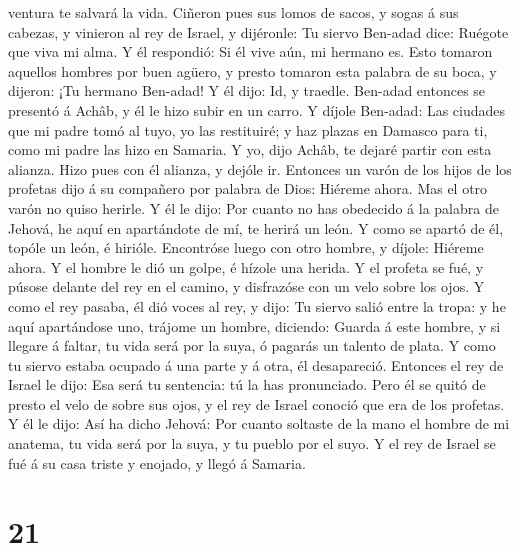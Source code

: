 ventura te salvará la vida.  Ciñeron pues sus lomos de
sacos, y sogas á sus cabezas, y vinieron al rey de Israel, y dijéronle:
Tu siervo Ben-adad dice: Ruégote que viva mi alma. Y él respondió: Si él
vive aún, mi hermano es.  Esto tomaron aquellos hombres por
buen agüero, y presto tomaron esta palabra de su boca, y dijeron: ¡Tu
hermano Ben-adad! Y él dijo: Id, y traedle. Ben-adad entonces se
presentó á Achâb, y él le hizo subir en un carro.  Y díjole
Ben-adad: Las ciudades que mi padre tomó al tuyo, yo las restituiré; y
haz plazas en Damasco para ti, como mi padre las hizo en Samaria. Y yo,
dijo Achâb, te dejaré partir con esta alianza. Hizo pues con él alianza,
y dejóle ir.  Entonces un varón de los hijos de los
profetas dijo á su compañero por palabra de Dios: Hiéreme ahora. Mas el
otro varón no quiso herirle.  Y él le dijo: Por cuanto no
has obedecido á la palabra de Jehová, he aquí en apartándote de mí, te
herirá un león. Y como se apartó de él, topóle un león, é hirióle.
 Encontróse luego con otro hombre, y díjole: Hiéreme ahora.
Y el hombre le dió un golpe, é hízole una herida.  Y el
profeta se fué, y púsose delante del rey en el camino, y disfrazóse con
un velo sobre los ojos.  Y como el rey pasaba, él dió voces
al rey, y dijo: Tu siervo salió entre la tropa: y he aquí apartándose
uno, trájome un hombre, diciendo: Guarda á este hombre, y si llegare á
faltar, tu vida será por la suya, ó pagarás un talento de plata.
 Y como tu siervo estaba ocupado á una parte y á otra, él
desapareció. Entonces el rey de Israel le dijo: Esa será tu sentencia:
tú la has pronunciado.  Pero él se quitó de presto el velo
de sobre sus ojos, y el rey de Israel conoció que era de los profetas.
 Y él le dijo: Así ha dicho Jehová: Por cuanto soltaste de
la mano el hombre de mi anatema, tu vida será por la suya, y tu pueblo
por el suyo.  Y el rey de Israel se fué á su casa triste y
enojado, y llegó á Samaria.

\hypertarget{section-20}{%
\section{21}\label{section-20}}

